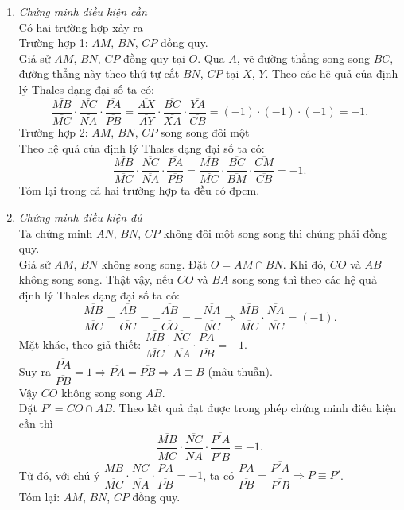 \begin{enumerate}
	\item \textit{Chứng minh điều kiện cần}\\
	Có hai trường hợp xảy ra\\
	Trường hợp 1: $AM$, $BN$, $CP$ đồng quy.\\
	Giả sử $AM$, $BN$, $CP$ đồng quy tại $O$. Qua $A$, vẽ đường thẳng song song $BC$, đường thẳng này theo thứ tự cắt $BN$, $CP$ tại $X$, $Y$. Theo các hệ quả của định lý Thales dạng đại số ta có:
	$$\dfrac{\overline{MB}}{\overline{MC}}\cdot \dfrac{\overline{NC}}{\overline{NA}}\cdot \dfrac{\overline{PA}}{\overline{PB}}= \dfrac{\overline{AX}}{\overline{AY}}\cdot \dfrac{\overline{BC}}{\overline{XA}}\cdot \dfrac{\overline{YA}}{\overline{CB}}=(-1)\cdot (-1)\cdot (-1)=-1.$$
	Trường hợp 2: $AM$, $BN$, $CP$ song song đôi một\\
	Theo hệ quả của định lý Thales dạng đại số ta có:
	$$\dfrac{\overline{MB}}{\overline{MC}}\cdot \dfrac{\overline{NC}}{\overline{NA}}\cdot \dfrac{\overline{PA}}{\overline{PB}}= \dfrac{\overline{MB}}{\overline{MC}}\cdot \dfrac{\overline{BC}}{\overline{BM}}\cdot \dfrac{\overline{CM}}{\overline{CB}}=-1.$$
	Tóm lại trong cả hai trường hợp ta đều có đpcm.
	\item \textit{Chứng minh điều kiện đủ}\\
	Ta chứng minh $AN$, $BN$, $CP$ không đôi một song song thì chúng phải đồng quy.\\
	Giả sử $AM$, $BN$ không song song. Đặt $O=AM \cap BN$. Khi đó, $CO$ và $AB$ không song song. Thật vậy, nếu $CO$ và $BA$ song song thì theo các hệ quả định lý Thales dạng đại số ta có:
	$$\dfrac{\overline{MB}}{\overline{MC}}= \dfrac{\overline{AB}}{\overline{OC}}= - \dfrac{\overline{AB}}{\overline{CO}}= - \dfrac{\overline{NA}}{\overline{NC}} \Rightarrow \dfrac{\overline{MB}}{\overline{MC}} \cdot \dfrac{\overline{NA}}{\overline{NC}}=(-1).$$
	Mặt khác, theo giả thiết: $\dfrac{\overline{MB}}{\overline{MC}}\cdot\dfrac{\overline{NC}}{\overline{NA}}\cdot\dfrac{\overline{PA}}{\overline{PB}}=-1$.\\
	Suy ra $\dfrac{\overline{PA}}{\overline{PB}}=1 \Rightarrow \overline{PA}= \overline{PB} \Rightarrow A \equiv B$ (mâu thuẫn).\\
	Vậy $CO$ không song song $AB$.\\
	Đặt $P'= CO \cap AB$. Theo kết quả đạt được trong phép chứng minh điều kiện cần thì 
	$$\dfrac{\overline{MB}}{\overline{MC}}\cdot\dfrac{\overline{NC}}{\overline{NA}}\cdot\dfrac{\overline{P'A}}{\overline{P'B}}=-1.$$
	Từ đó, với chú ý $\dfrac{\overline{MB}}{\overline{MC}}\cdot\dfrac{\overline{NC}}{\overline{NA}}\cdot\dfrac{\overline{PA}}{\overline{PB}}=-1$, ta có $\dfrac{\overline{PA}}{\overline{PB}}= \dfrac{\overline{P'A}}{\overline{P'B}} \Rightarrow P \equiv P'$.\\
	Tóm lại: $AM$, $BN$, $CP$ đồng quy.
\end{enumerate}


